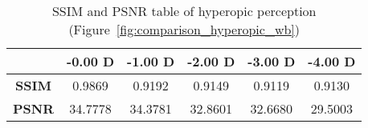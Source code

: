 
\begin{table}[!b]
	\centering
	\label{table:metrics_hyperopic_wb}
	\caption[SSIM and PSNR table of hyperopic perception (Figure~\ref{fig:comparison_hyperopic_wb})]{SSIM and PSNR table of hyperopic perception (Figure~\ref{fig:comparison_hyperopic_wb})}
	
	\begin{tabular}{cccccc}
	{\bf }                          & {\bf -0.00 D} & {\bf -1.00 D} & {\bf -2.00 D} & {\bf -3.00 D} & {\bf -4.00 D} \\ \hline
	\multicolumn{1}{c|}{{\bf SSIM}} & 0.9869  		& 0.9192  		& 0.9149  		& 0.9119  		& 0.9130  		\\
	\multicolumn{1}{c|}{{\bf PSNR}} & 34.7778 		& 34.3781 		& 32.8601 		& 32.6680 		& 29.5003
	\end{tabular}
\end{table}